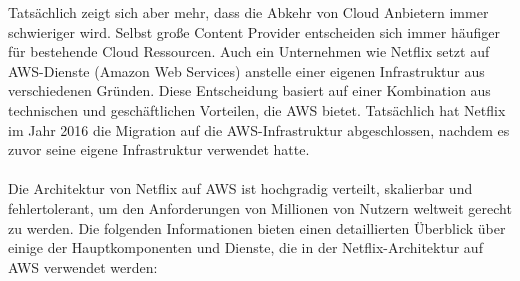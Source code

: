 \documentclass[../vs-script-first-v01.tex]{subfiles}
\begin{document}
Tatsächlich zeigt sich aber mehr, dass die Abkehr von Cloud Anbietern immer schwieriger wird. Selbst große Content Provider entscheiden sich immer häufiger für bestehende Cloud Ressourcen. Auch ein Unternehmen wie Netflix setzt auf AWS-Dienste (Amazon Web Services) anstelle einer eigenen Infrastruktur aus verschiedenen Gründen. Diese Entscheidung basiert auf einer Kombination aus technischen und geschäftlichen Vorteilen, die AWS bietet. Tatsächlich hat Netflix im Jahr 2016 die Migration auf die AWS-Infrastruktur abgeschlossen, nachdem es zuvor seine eigene Infrastruktur verwendet hatte. 
\\\\
Die Architektur von Netflix auf AWS ist hochgradig verteilt, skalierbar und fehlertolerant, um den Anforderungen von Millionen von Nutzern weltweit gerecht zu werden. Die folgenden Informationen bieten einen detaillierten Überblick über einige der Hauptkomponenten und Dienste, die in der Netflix-Architektur auf AWS verwendet werden:
\end{document}

